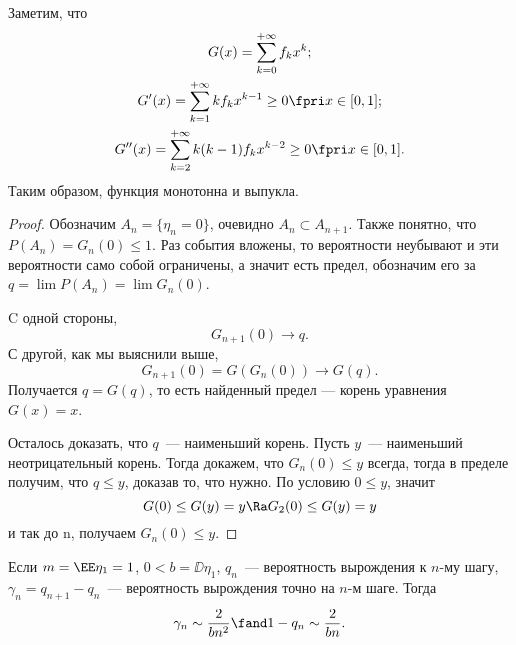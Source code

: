  Заметим, что
 \begin{gather*}
     G(x) = \sum\limits_{k=0} ^ {+\infty} f_kx^k; \\
     G^\prime(x) = \sum\limits_{k=1} ^ {+\infty} kf_kx^{k - 1}\ge 0 \fpri x\in [0, 1]; \\
     G^{\prime \prime}(x) = \sum\limits_{k=2} ^ {+\infty} k(k - 1)f_kx^{k - 2}\ge 0\fpri x\in [0, 1].
 \end{gather*}
     Таким образом, функция монотонна и выпукла.
 \begin{proof}
     Обозначим
     $A_n = \{\eta_n = 0\}$, очевидно $A_n \subset A_{n + 1}$. Также понятно, что
     $P(A_n) = G_n(0) \le 1$.
     Раз события вложены, то вероятности неубывают и эти вероятности само собой ограничены, а значит есть предел, обозначим его за
     $q = \lim P(A_n) = \lim G_n(0)$.

     C одной стороны, $$G_{n + 1}(0) \to q.$$
     С другой, как мы выяснили выше,
     $$G_{n + 1}(0)= G(G_n(0))\to G(q).$$ 
     Получается $q = G(q)$, то есть найденный предел --- корень
     уравнения $G(x) = x$.

     Осталось доказать, что $q$~--- наименьший корень. Пусть $y$~--- наименьший неотрицательный корень. Тогда докажем, что $G_n(0)\le y$ всегда, тогда в
     пределе получим, что $q \le y$, доказав то, что нужно.
По условию $0\le y$, значит
$$G(0)\le G(y) = y \Ra G_2(0) \le G(y) = y$$ и так до n, получаем $G_n(0) \le y$.
 \end{proof}


 \begin{theorem}
     Если $m = \EE \eta_1 = 1$, $0 < b= \DD\eta_1$, $q_n$~--- вероятность вырождения к $n$-му шагу, $\gamma_n = q_{n+ 1} - q_n$~--- вероятность
     вырождения точно на $n$-м шаге. Тогда 
     $$\gamma_n \sim \frac{2}{bn^2} \fand 1-q_n\sim \frac{2}{bn}.$$
 \end{theorem}

